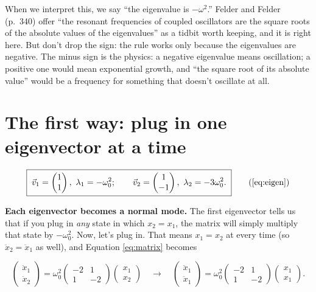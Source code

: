 \documentclass[12pt]{article}
\numberwithin{equation}{section}
\newcommand{\wo}{\omega_0}
\begin{document}
When we interpret this, we say ``the eigenvalue is $-\omega^2$.'' Felder
and Felder (p.~340) offer ``the resonant frequencies of coupled
oscillators are the square roots of the absolute values of the
eigenvalues'' as a tidbit worth keeping, and it is right here. But don't
drop the sign: the rule works only because the eigenvalues are negative.
The minus sign is the physics: a negative eigenvalue means oscillation; a
positive one would mean exponential growth, and ``the square root of its
absolute value'' would be a frequency for something that doesn't oscillate
at all.

\newpage
\section{The first way: plug in one eigenvector at a time}
\label{sec:way1}

\begin{equation*}
  \boxed{\;\vec{v}_1 = \begin{pmatrix} 1 \\ 1 \end{pmatrix},\ \lambda_1 = -\wo^2;
  \qquad
  \vec{v}_2 = \begin{pmatrix} 1 \\ -1 \end{pmatrix},\ \lambda_2 = -3\wo^2.\;}
  \tag{\ref*{eq:eigen}}
\end{equation*}

\medskip

\noindent\textbf{Each eigenvector becomes a normal mode.} The first
eigenvector tells us that if you plug in \emph{any} state in which $x_2 =
x_1$, the matrix will simply multiply that state by $-\wo^2$. Now, let's
plug in. That means $x_1 = x_2$ at every time (so $\ddot{x}_2 = \ddot{x}_1$
as well), and Equation \eqref{eq:matrix} becomes

\begin{equation}
  \begin{pmatrix} \ddot{x}_1 \\ \ddot{x}_2 \end{pmatrix}
  = \wo^2 \begin{pmatrix} -2 & 1 \\ 1 & -2 \end{pmatrix}
  \begin{pmatrix} x_1 \\ x_2 \end{pmatrix}
  \quad\rightarrow\quad
  \begin{pmatrix} \ddot{x}_1 \\ \ddot{x}_1 \end{pmatrix}
  = \wo^2 \begin{pmatrix} -2 & 1 \\ 1 & -2 \end{pmatrix}
  \begin{pmatrix} x_1 \\ x_1 \end{pmatrix} .
\end{equation}
\end{document}

